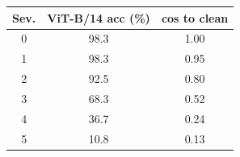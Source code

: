 \begin{tabular}{ccc}
\toprule
Sev. & ViT-B/14 acc (\%) & cos to clean \\
\midrule
0 & 98.3 & 1.00 \\
1 & 98.3 & 0.95 \\
2 & 92.5 & 0.80 \\
3 & 68.3 & 0.52 \\
4 & 36.7 & 0.24 \\
5 & 10.8 & 0.13 \\
\bottomrule
\end{tabular}
